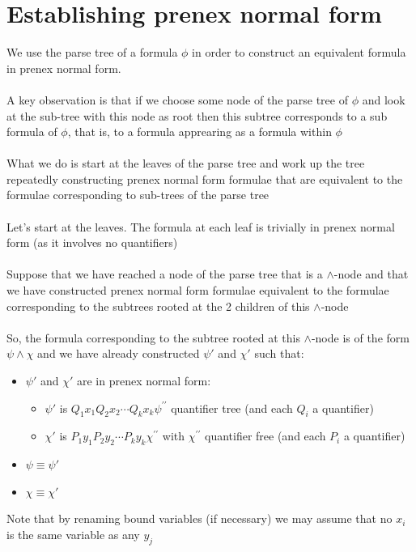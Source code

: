 \documentclass{article}[18pt]
\begin{document}
\section{Establishing prenex normal form}
We use the parse tree of a formula $\phi$ in order to construct an equivalent formula in prenex normal form.\\
\\
A key observation is that if we choose some node of the parse tree of $\phi$ and look at the sub-tree with this node as root then this subtree corresponds to a sub formula of $\phi$, that is, to a formula apprearing as a formula within $\phi$\\
\\
What we do is start at the leaves of the parse tree and work up the tree repeatedly constructing prenex normal form formulae that are equivalent to the formulae corresponding to sub-trees of the parse tree\\
\\
Let's start at the leaves. The formula at each leaf is trivially in prenex normal form (as it involves no quantifiers)\\
\\
Suppose that we have reached a node of the parse tree that is a $\land$-node and that we have constructed prenex normal form formulae equivalent to the formulae corresponding to the subtrees rooted at the 2 children of this $\land$-node\\
\\
So, the formula corresponding to the subtree rooted at this $\land$-node is of the form $\psi\land \chi$ and we have already constructed $\psi'$ and $\chi'$ such that:
\begin{itemize}
	\item $\psi'$ and $\chi'$ are in prenex normal form:
	\begin{itemize}
		\item $\psi'$ is $Q _ { 1 } x _ { 1 } Q _ { 2 } x _ { 2 } \cdots Q _ { k } x _ { k } \psi ^ { \prime \prime }$ quantifier tree (and each $Q_i$ a quantifier)
		\item $\chi'$ is $P _ { 1 } y _ { 1 } P _ { 2 } y _ { 2 } \cdots P _ { k } y _ { k } \chi ^ { \prime \prime }$ with $\chi ^ { \prime \prime }$ quantifier free (and each $P_i$ a quantifier)
	\end{itemize}
	\item $\psi\equiv\psi'$
	\item $\chi\equiv\chi'$
\end{itemize}
Note that by renaming bound variables (if necessary) we may assume that no $x_i$ is the same variable as any $y_j$\\
\end{document}

